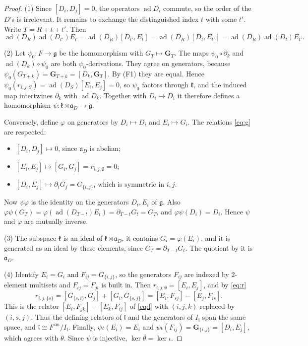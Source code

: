 \documentclass[11pt]{amsart}
\theoremstyle{definition}
\theoremstyle{remark}
\newcommand{\g}{\mathfrak{g}}
\newcommand{\lie}{\mathfrak{l}}
\newcommand{\kr}{\mathfrak{k}}
\newcommand{\af}{\mathfrak{a}}
\newcommand{\ad}{\operatorname{ad}}
\begin{document}
\begin{proof}
(1) Since $[D_i,D_j]=0$, the operators $\ad D_i$ commute, so the order of the $D$'s is irrelevant. It remains to exchange the distinguished index $t$ with some $t'$. Write $T=R+t+t'$. Then
\[
\ad(D_R)\ad(D_{t'})E_t=\ad(D_R)[D_{t'},E_t]=\ad(D_R)[D_t,E_{t'}]=\ad(D_R)\ad(D_t)E_{t'}.
\]

(2) Let $\psi_0\colon F\to\g$ be the homomorphism with $G_T\mapsto\mathbf G_T$. The maps $\psi_0\circ\partial_k$ and $\ad(D_k)\circ\psi_0$ are both $\psi_0$-derivations. They agree on generators, because $\psi_0(G_{T+k})=\mathbf G_{T+k}=[D_k,\mathbf G_T]$. By (F1) they are equal. Hence $\psi_0(r_{i,j,S})=\ad(D_S)[E_i,E_j]=0$, so $\psi_0$ factors through $\kr$, and the induced map intertwines $\partial_k$ with $\ad D_k$. Together with $D_i\mapsto D_i$ it therefore defines a homomorphism $\psi\colon\kr\rtimes\af_D\to\g$.

Conversely, define $\varphi$ on generators by $D_i\mapsto D_i$ and $E_i\mapsto G_i$. The relations \eqref{eq:g} are respected:
\begin{itemize}
\item $[D_i,D_j]\mapsto0$, since $\af_D$ is abelian;
\item $[E_i,E_j]\mapsto[G_i,G_j]=r_{i,j,\emptyset}=0$;
\item $[D_i,E_j]\mapsto\partial_iG_j=G_{\{i,j\}}$, which is symmetric in $i,j$.
\end{itemize}
Now $\psi\varphi$ is the identity on the generators $D_i,E_i$ of $\g$. Also $\varphi\psi(G_T)=\varphi(\ad(D_{T-t})E_t)=\partial_{T-t}G_t=G_T$, and $\varphi\psi(D_i)=D_i$. Hence $\psi$ and $\varphi$ are mutually inverse.

(3) The subspace $\kr$ is an ideal of $\kr\rtimes\af_D$, it contains $G_i=\varphi(E_i)$, and it is generated as an ideal by these elements, since $G_T=\partial_{T-t}G_t$. The quotient by it is $\af_D$.

(4) Identify $E_i=G_i$ and $F_{ij}=G_{\{i,j\}}$, so the generators $F_{ij}$ are indexed by $2$-element multisets and $F_{ij}=F_{ji}$ is built in. Then $r_{i,j,\emptyset}=[E_i,E_j]$, and by \eqref{eq:r}
\[
r_{i,j,\{s\}}=[G_{\{s,i\}},G_j]+[G_i,G_{\{s,j\}}]=[E_i,F_{sj}]-[E_j,F_{is}].
\]
This is the relator $[E_i,F_{jk}]-[E_k,F_{ij}]$ of \eqref{eq:l} with $(i,j,k)$ replaced by $(i,s,j)$. Thus the defining relators of $\lie$ and the generators of $I_{\lie}$ span the same space, and $\lie\cong F^{\mathrm{sm}}/I_{\lie}$. Finally, $\psi\iota(E_i)=E_i$ and $\psi\iota(F_{ij})=\mathbf G_{\{i,j\}}=[D_i,E_j]$, which agrees with $\theta$. Since $\psi$ is injective, $\ker\theta=\ker\iota$.
\end{proof}
\end{document}
